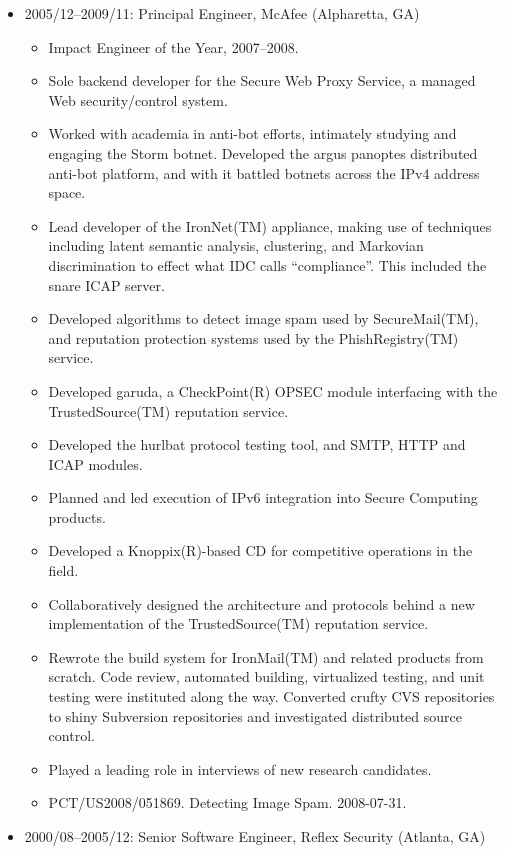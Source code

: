\documentclass[11pt]{article}
\newenvironment{tightitemize}
{\begin{itemize}
  \setlength{\itemsep}{1pt}
  \setlength{\parskip}{0pt}
  \setlength{\parsep}{0pt}}
{\end{itemize}}
\begin{document}
\begin{tightitemize}
\item 2005/12--2009/11: Principal Engineer, McAfee (Alpharetta, GA)

\begin{tightitemize}
\item Impact Engineer of the Year, 2007--2008.
\item Sole backend developer for the Secure Web Proxy Service, a managed Web
  security/control system.
\item Worked with academia in anti-bot efforts, intimately studying and engaging
  the Storm botnet. Developed the argus panoptes distributed anti-bot
  platform, and with it battled botnets across the IPv4 address space.
\item Lead developer of the IronNet(TM) appliance, making use of techniques
  including latent semantic analysis, clustering, and Markovian discrimination
  to effect what IDC calls ``compliance''. This included the snare ICAP server.
\item Developed algorithms to detect image spam used by SecureMail(TM), and
  reputation protection systems used by the PhishRegistry(TM) service.
\item Developed garuda, a CheckPoint(R) OPSEC module interfacing with the
  TrustedSource(TM) reputation service.
\item Developed the hurlbat protocol testing tool, and SMTP, HTTP and ICAP modules.
\item Planned and led execution of IPv6 integration into Secure Computing products.
\item Developed a Knoppix(R)-based CD for competitive operations in the field.
\item Collaboratively designed the architecture and protocols behind a new
  implementation of the TrustedSource(TM) reputation service.
\item Rewrote the build system for IronMail(TM) and related products from scratch.
  Code review, automated building, virtualized testing, and unit testing were
  instituted along the way. Converted crufty CVS repositories to shiny
  Subversion repositories and investigated distributed source control.
\item Played a leading role in interviews of new research candidates.
\item PCT/US2008/051869. Detecting Image Spam. 2008-07-31.
\end{tightitemize}

\item 2000/08--2005/12: Senior Software Engineer, Reflex Security (Atlanta, GA)


\end{tightitemize}
\end{document}
